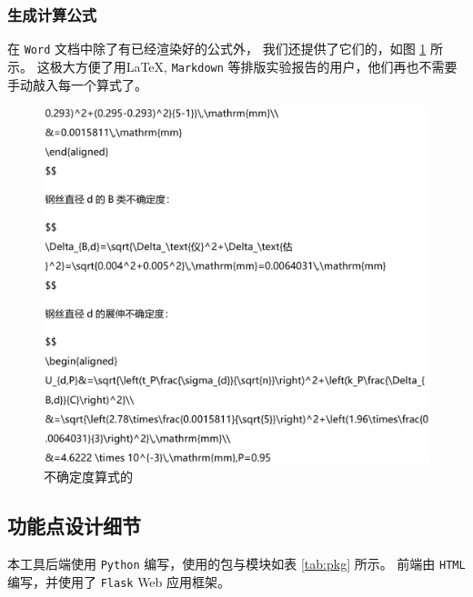 \subsubsection*{生成计算公式}

在 \verb|Word| 文档中除了有已经渲染好的公式外，
我们还提供了它们的，如图 \ref{fig:latex} 所示。
这极大方便了用\LaTeX, \verb|Markdown| 等排版实验报告的用户，他们再也不需要手动敲入每一个算式了。

\begin{figure}[htbp]
  \centering
  \includegraphics[width=\columnwidth]{figure/latex.png}
  \caption{不确定度算式的}
  \label{fig:latex}
\end{figure}

\subsection{功能点设计细节}

本工具后端使用 \verb|Python| 编写，使用的包与模块如表 \ref{tab:pkg} 所示。
前端由 \verb|HTML| 编写，并使用了 \verb|Flask| Web 应用框架。


